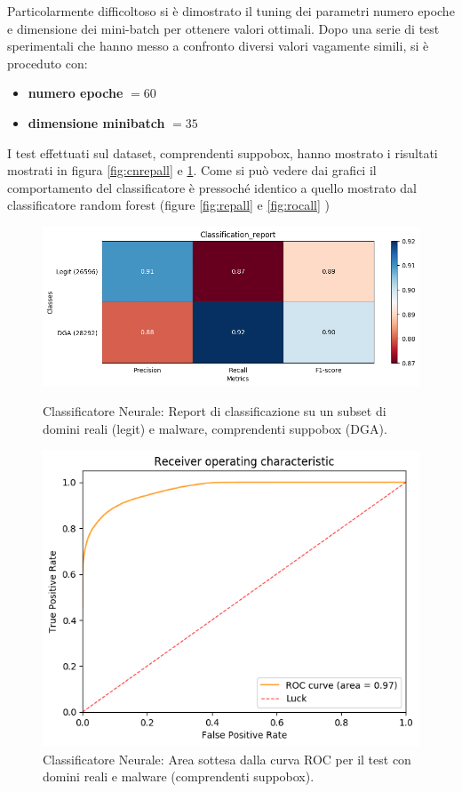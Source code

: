 Particolarmente difficoltoso si è dimostrato il tuning dei parametri numero epoche e dimensione dei mini-batch per ottenere valori ottimali. Dopo una serie di test sperimentali che hanno messo a confronto diversi valori vagamente simili, si è proceduto con:
\begin{itemize}
\item \textbf{numero epoche} $= 60$
\item \textbf{dimensione minibatch} $= 35$ 
\end{itemize}

I test effettuati sul dataset, comprendenti suppobox, hanno mostrato i risultati mostrati in figura \ref{fig:cnrepall} e \ref{fig:cnrocall}. Come si può vedere dai grafici il comportamento del classificatore è pressoché identico a quello mostrato dal classificatore random forest (figure \ref{fig:repall} e \ref{fig:rocall} )

\begin{figure}[!ht]
    \centering
    \includegraphics[width=\columnwidth]{figures/clas_nn/class_rep.png}
    \caption{Classificatore Neurale: Report di classificazione su un subset di domini reali (legit) e malware, comprendenti suppobox (DGA).\label{fig:cnrepall}}

    \centering
    \includegraphics[width=\columnwidth]{figures/clas_nn/roc_plot.png}
    \caption{Classificatore Neurale: Area sottesa dalla curva ROC per il test con domini reali e malware (comprendenti suppobox).\label{fig:cnrocall}}
\end{figure}

